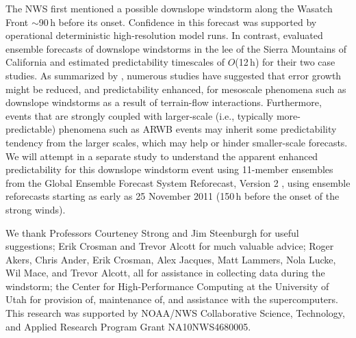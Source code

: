 \documentclass[pdftex,12pt]{article}
\def\around{$\sim$}
\begin{document}
The NWS first mentioned a possible downslope windstorm along the Wasatch Front \around 90\,h before its onset. Confidence in this forecast was supported by operational deterministic high-resolution model runs. In contrast, \citet{Reinecke2009} evaluated ensemble forecasts of downslope windstorms in the lee of the Sierra Mountains of California and estimated predictability timescales of $O$(12\,h) for their two case studies. As summarized by \citet{Doyle2013}, numerous studies have suggested that error growth might be reduced, and predictability enhanced, for mesoscale phenomena such as downslope windstorms as a result of terrain-flow interactions. Furthermore, events that are strongly coupled with larger-scale (i.e., typically more-predictable) phenomena such as ARWB events may inherit some predictability tendency from the larger scales, which may help \citep{Palmer1993} or hinder \citep{Durran2014-qf} smaller-scale forecasts. We will attempt in a separate study to understand the apparent enhanced predictability for this downslope windstorm event using 11-member ensembles from the Global Ensemble Forecast System Reforecast, Version 2 \citep{Hamill2013-tt}, using ensemble reforecasts starting as early as 25 November 2011 (150\,h before the onset of the strong winds). 


\begin{acknowledgment} 
We thank Professors Courteney Strong and Jim Steenburgh for useful suggestions; Erik Crosman and Trevor Alcott for much valuable advice; Roger Akers, Chris Ander, Erik Crosman, Alex Jacques, Matt Lammers, Nola Lucke, Wil Mace, and Trevor Alcott, all for assistance in collecting data during the windstorm; the Center for High-Performance Computing at the University of Utah for provision of, maintenance of, and assistance with the supercomputers. This research was supported by NOAA/NWS Collaborative Science, Technology, and Applied Research Program Grant NA10NWS4680005.
\end{acknowledgment}

{}
{\clearpage}

{}
{\clearpage}



\end{document}
